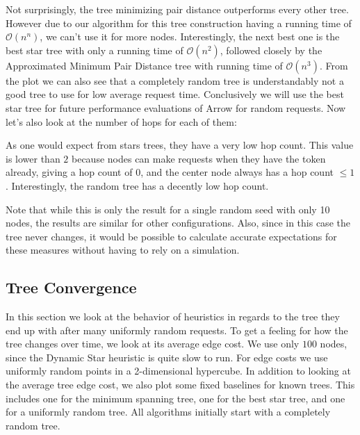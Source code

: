 \documentclass[a4paper, oneside]{discothesis}
\begin{document}
Not surprisingly, the tree minimizing pair distance outperforms every other tree. However due to our algorithm for this tree construction having a running time of $\mathcal{O}(n^n)$, we can't use it for more nodes. Interestingly, the next best one is the best star tree with only a running time of $\mathcal{O}(n^2)$, followed closely by the Approximated Minimum Pair Distance tree with running time of $\mathcal{O}(n^3)$. From the plot we can also see that a completely random tree is understandably not a good tree to use for low average request time. Conclusively we will use the best star tree for future performance evaluations of Arrow for random requests. Now let's also look at the number of hops for each of them:


As one would expect from stars trees, they have a very low hop count. This value is lower than $2$ because nodes can make requests when they have the token already, giving a hop count of $0$, and the center node always has a hop count $\leq 1$. Interestingly, the random tree has a decently low hop count.

Note that while this is only the result for a single random seed with only 10 nodes, the results are similar for other configurations. Also, since in this case the tree never changes, it would be possible to calculate accurate expectations for these measures without having to rely on a simulation.

\subsection{Tree Convergence}\label{result:convergence}

In this section we look at the behavior of heuristics in regards to the tree they end up with after many uniformly random requests. To get a feeling for how the tree changes over time, we look at its average edge cost. We use only $100$ nodes, since the Dynamic Star heuristic is quite slow to run. For edge costs we use uniformly random points in a 2-dimensional hypercube. In addition to looking at the average tree edge cost, we also plot some fixed baselines for known trees. This includes one for the minimum spanning tree, one for the best star tree, and one for a uniformly random tree. All algorithms initially start with a completely random tree.
\end{document}
